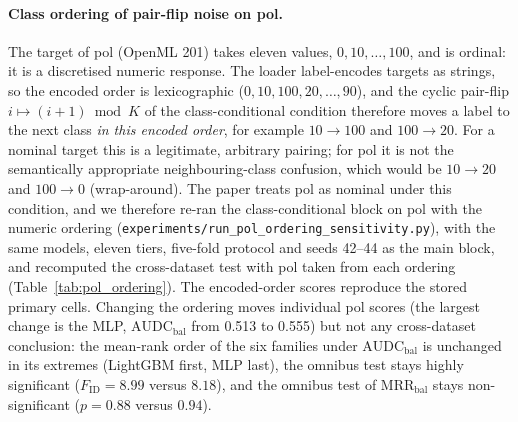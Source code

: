 \documentclass[pdflatex,sn-mathphys]{sn-jnl}
\newcommand{\AUDC}{\mathrm{AUDC}}
\newcommand{\MRR}{\mathrm{MRR}}
\theoremstyle{thmstyleone}
\begin{document}
\paragraph{Class ordering of pair-flip noise on pol.} The target of pol (OpenML 201) takes eleven values, $0, 10, \dots, 100$, and is ordinal: it is a discretised numeric response. The loader label-encodes targets as strings, so the encoded order is lexicographic ($0, 10, 100, 20, \dots, 90$), and the cyclic pair-flip $i \mapsto (i+1) \bmod K$ of the class-conditional condition therefore moves a label to the next class \emph{in this encoded order}, for example $10 \to 100$ and $100 \to 20$. For a nominal target this is a legitimate, arbitrary pairing; for pol it is not the semantically appropriate neighbouring-class confusion, which would be $10 \to 20$ and $100 \to 0$ (wrap-around). The paper treats pol as nominal under this condition, and we therefore re-ran the class-conditional block on pol with the numeric ordering (\texttt{experiments/run\_pol\_ordering\_sensitivity.py}), with the same models, eleven tiers, five-fold protocol and seeds 42--44 as the main block, and recomputed the cross-dataset test with pol taken from each ordering (Table~\ref{tab:pol_ordering}). The encoded-order scores reproduce the stored primary cells. Changing the ordering moves individual pol scores (the largest change is the MLP, $\AUDC_{\mathrm{bal}}$ from 0.513 to 0.555) but not any cross-dataset conclusion: the mean-rank order of the six families under $\AUDC_{\mathrm{bal}}$ is unchanged in its extremes (LightGBM first, MLP last), the omnibus test stays highly significant ($F_{\mathrm{ID}}=8.99$ versus $8.18$), and the omnibus test of $\MRR_{\mathrm{bal}}$ stays non-significant ($p=0.88$ versus $0.94$).




\end{document}
